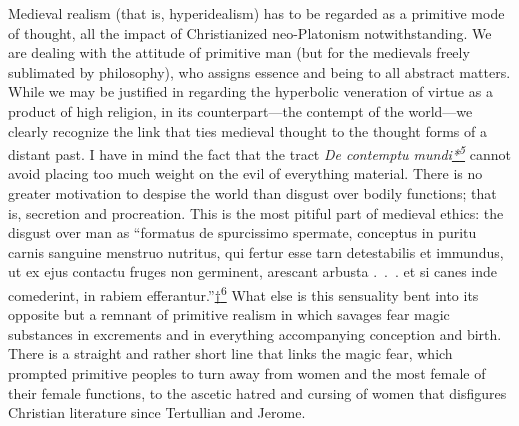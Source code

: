 Medieval realism (that is, hyperidealism) has to be regarded as a
primitive mode of thought, all the impact of Christianized neo-Platonism
notwithstanding. We are dealing with the attitude of primitive man (but
for the medievals freely sublimated by philosophy), who assigns essence
and being to all abstract matters. While we may be justified in
regarding the hyperbolic veneration of virtue as a product of high
religion, in its counterpart---the contempt of the world---we clearly
recognize the link that ties medieval thought to the thought forms of a
distant past. I have in mind the fact that the tract \emph{De contemptu
mundi\protect\hypertarget{17_Chapter_Ten__THE_FAILURE_OF_IMAG.xhtmlux5cux23id_2329}{\protect\hyperlink{23_NOTES.xhtmlux5cux23id_2330}{*\textsuperscript{5}}}}
cannot avoid placing too much weight on the evil of everything material.
There is no greater motivation to despise the world than disgust over
bodily functions; that is, secretion and procreation. This is the most
pitiful part of medieval ethics: the disgust over man as ``formatus de
spurcissimo spermate, conceptus in puritu carnis sanguine menstruo
nutritus, qui fertur esse tarn detestabilis et immundus, ut ex ejus
contactu fruges non germinent, arescant arbusta .~.~. et si canes inde
comederint, in rabiem
efferantur.''\protect\hypertarget{17_Chapter_Ten__THE_FAILURE_OF_IMAG.xhtmlux5cux23id_2331}{\protect\hyperlink{23_NOTES.xhtmlux5cux23id_2332}{†\textsuperscript{6}}}
What else is this sensuality bent into its
oppo\protect\hypertarget{17_Chapter_Ten__THE_FAILURE_OF_IMAG.xhtmlux5cux23page_255}{}{}site
but a remnant of primitive realism in which savages fear magic
substances in excrements and in everything accompanying conception and
birth. There is a straight and rather short line that links the magic
fear, which prompted primitive peoples to turn away from women and the
most female of their female functions, to the ascetic hatred and cursing
of women that disfigures Christian literature since Tertullian and
Jerome.

